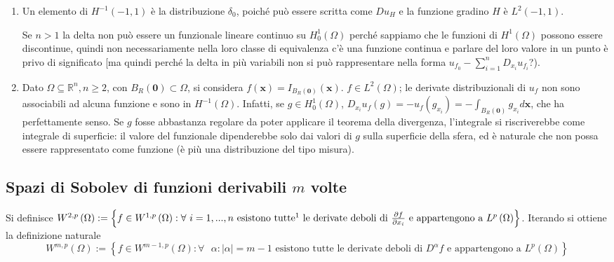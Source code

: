 \documentclass{article}
\begin{document}
\begin{enumerate}
\item Un elemento di $H^{-1}\left( -1,1\right) $ \`{e} la distribuzione $%
\delta _{0}$, poich\'{e} pu\`{o} essere scritta come $Du_{H}$ e la funzione
gradino $H$ \`{e} $L^{2}\left( -1,1\right) $.

Se $n>1$ la delta non pu\`{o} essere un funzionale lineare continuo su $%
H_{0}^{1}\left( \Omega \right) $ perch\'{e} sappiamo che le funzioni di $%
H^{1}\left( \Omega \right) $ possono essere discontinue, quindi non
necessariamente nella loro classe di equivalenza c'\`{e} una funzione
continua e parlare del loro valore in un punto \`{e} privo di significato
[ma quindi perch\'{e} la delta in pi\`{u} variabili non si pu\`{o}
rappresentare nella forma $u_{f_{0}}-\sum_{i=1}^{n}D_{x_{i}}u_{f_{i}}$?).

\item Dato $\Omega \subseteq 
\mathbb{R}
^{n},n\geq 2$, con $B_{R}\left( \mathbf{0}\right) \subset \Omega $, si
considera $f\left( \mathbf{x}\right) =I_{B_{R}\left( \mathbf{0}\right)
}\left( \mathbf{x}\right) $. $f\in L^{2}\left( \Omega \right) $; le derivate
distribuzionali di $u_{f}$ non sono associabili ad alcuna funzione e sono in 
$H^{-1}\left( \Omega \right) $. Infatti, se $g\in H_{0}^{1}\left( \Omega
\right) $, $D_{x_{i}}u_{f}\left( g\right) =-u_{f}\left( g_{x_{i}}\right)
=-\int_{B_{R}\left( \mathbf{0}\right) }g_{x_{i}}d\mathbf{x}$, che ha
perfettamente senso. Se $g$ fosse abbastanza regolare da poter applicare il
teorema della divergenza, l'integrale si riscriverebbe come integrale di
superficie: il valore del funzionale dipenderebbe solo dai valori di $g$
sulla superficie della sfera, ed \`{e} naturale che non possa essere
rappresentato come funzione (\`{e} pi\`{u} una distribuzione del tipo
misura).
\end{enumerate}

\subsection{Spazi di Sobolev di funzioni derivabili $m$ volte}

Si definisce $W^{2,p}\left( \Omega \right) :=\left\{ f\in W^{1,p}\left(
\Omega \right) :\forall \text{ }i=1,...,n\text{ esistono tutte\footnote{$%
\forall $ $i=1,...,n$} le derivate deboli di }\frac{\partial f}{\partial
x_{i}}\text{ e appartengono a }L^{p}\left( \Omega \right) \right\} $.
Iterando si ottiene la definizione naturale 
\begin{equation*}
W^{m,p}\left( \Omega \right)
:=\left\{ f\in W^{m-1,p}\left( \Omega \right) :\forall \text{ }\alpha
:\left\vert \alpha \right\vert =m-1\text{ esistono tutte le derivate deboli
di }D^{\alpha }f\text{ e appartengono a }L^{p}\left( \Omega \right) \right\} 
\end{equation*}
\end{document}
